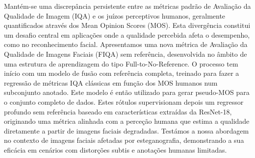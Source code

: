 Mantém-se uma discrepância persistente entre as métricas padrão de Avaliação da Qualidade de Imagem (IQA) e os juízos perceptivos humanos, geralmente quantificados através dos Mean Opinion Scores (MOS). Esta divergência constitui um desafio central em aplicações onde a qualidade percebida afeta o desempenho, como no reconhecimento facial. Apresentamos uma nova métrica de Avaliação da Qualidade de Imagens Faciais (FIQA) sem referência, desenvolvida no âmbito de uma estrutura de aprendizagem do tipo Full-to-No-Reference. O processo tem início com um modelo de fusão com referência completa, treinado para fazer a regressão de métricas IQA clássicas em função dos MOS humanos num subconjunto anotado. Este modelo é então utilizado para gerar pseudo-MOS para o conjunto completo de dados. Estes rótulos supervisionam depois um regressor profundo sem referência baseado em características extraídas da ResNet-18, originando uma métrica alinhada com a perceção humana que estima a qualidade diretamente a partir de imagens faciais degradadas. Testámos a nossa abordagem no contexto de imagens faciais afetadas por esteganografia, demonstrando a sua eficácia em cenários com distorções subtis e anotações humanas limitadas.
